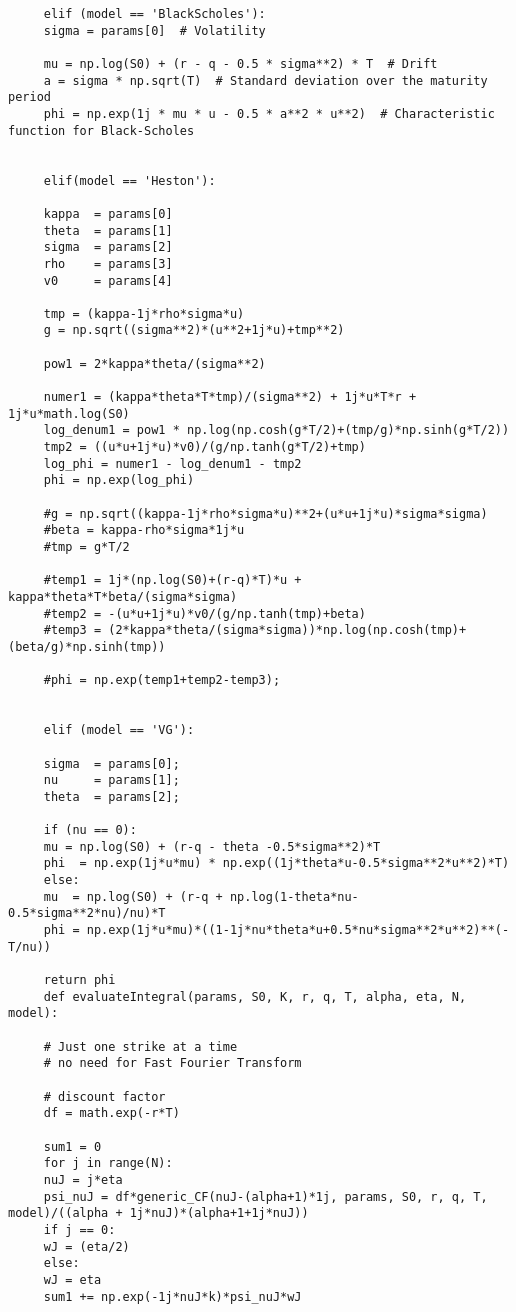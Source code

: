 \documentclass[letterpaper]{article}
\begin{document}
\begin{lstlisting}
     elif (model == 'BlackScholes'):
     sigma = params[0]  # Volatility
     
     mu = np.log(S0) + (r - q - 0.5 * sigma**2) * T  # Drift
     a = sigma * np.sqrt(T)  # Standard deviation over the maturity period
     phi = np.exp(1j * mu * u - 0.5 * a**2 * u**2)  # Characteristic function for Black-Scholes
     
     
     elif(model == 'Heston'):
     
     kappa  = params[0]
     theta  = params[1]
     sigma  = params[2]
     rho    = params[3]
     v0     = params[4]
     
     tmp = (kappa-1j*rho*sigma*u)
     g = np.sqrt((sigma**2)*(u**2+1j*u)+tmp**2)
     
     pow1 = 2*kappa*theta/(sigma**2)
     
     numer1 = (kappa*theta*T*tmp)/(sigma**2) + 1j*u*T*r + 1j*u*math.log(S0)
     log_denum1 = pow1 * np.log(np.cosh(g*T/2)+(tmp/g)*np.sinh(g*T/2))
     tmp2 = ((u*u+1j*u)*v0)/(g/np.tanh(g*T/2)+tmp)
     log_phi = numer1 - log_denum1 - tmp2
     phi = np.exp(log_phi)
     
     #g = np.sqrt((kappa-1j*rho*sigma*u)**2+(u*u+1j*u)*sigma*sigma)
     #beta = kappa-rho*sigma*1j*u
     #tmp = g*T/2
     
     #temp1 = 1j*(np.log(S0)+(r-q)*T)*u + kappa*theta*T*beta/(sigma*sigma)
     #temp2 = -(u*u+1j*u)*v0/(g/np.tanh(tmp)+beta)
     #temp3 = (2*kappa*theta/(sigma*sigma))*np.log(np.cosh(tmp)+(beta/g)*np.sinh(tmp))
     
     #phi = np.exp(temp1+temp2-temp3);
     
     
     elif (model == 'VG'):
     
     sigma  = params[0];
     nu     = params[1];
     theta  = params[2];
     
     if (nu == 0):
     mu = np.log(S0) + (r-q - theta -0.5*sigma**2)*T
     phi  = np.exp(1j*u*mu) * np.exp((1j*theta*u-0.5*sigma**2*u**2)*T)
     else:
     mu  = np.log(S0) + (r-q + np.log(1-theta*nu-0.5*sigma**2*nu)/nu)*T
     phi = np.exp(1j*u*mu)*((1-1j*nu*theta*u+0.5*nu*sigma**2*u**2)**(-T/nu))
     
     return phi
     def evaluateIntegral(params, S0, K, r, q, T, alpha, eta, N, model):
     
     # Just one strike at a time
     # no need for Fast Fourier Transform
     
     # discount factor
     df = math.exp(-r*T)
     
     sum1 = 0
     for j in range(N):
     nuJ = j*eta
     psi_nuJ = df*generic_CF(nuJ-(alpha+1)*1j, params, S0, r, q, T, model)/((alpha + 1j*nuJ)*(alpha+1+1j*nuJ))
     if j == 0:
     wJ = (eta/2)
     else:
     wJ = eta
     sum1 += np.exp(-1j*nuJ*k)*psi_nuJ*wJ
     

\end{lstlisting}
\end{document}

